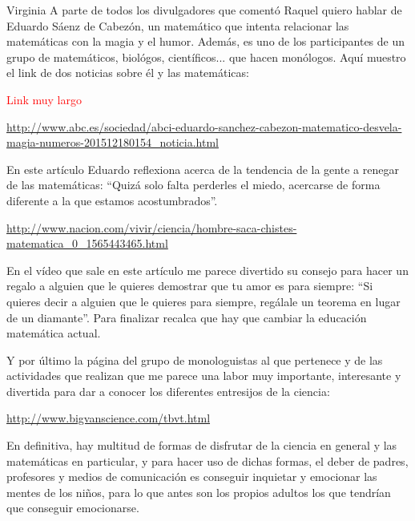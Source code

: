 \begin{opin}{\virgicolor}{Virginia}
A parte de todos los divulgadores que comentó Raquel quiero hablar de Eduardo Sáenz de Cabezón, un matemático que intenta relacionar las matemáticas con la magia y el humor. Además, es uno de los participantes de un grupo de matemáticos, biológos, científicos... que hacen monólogos. Aquí muestro el link de dos noticias sobre él y las matemáticas:



\textcolor{red}{Link muy largo}

\url{http://www.abc.es/sociedad/abci-eduardo-sanchez-cabezon-matematico-desvela-magia-numeros-201512180154_noticia.html}

En este artículo Eduardo reflexiona acerca de la tendencia de la gente a renegar de las matemáticas: “Quizá solo falta perderles el miedo, acercarse de forma diferente a la que estamos acostumbrados”.

\url{http://www.nacion.com/vivir/ciencia/hombre-saca-chistes-matematica_0_1565443465.html}

En el vídeo que sale en este artículo me parece divertido su consejo para hacer un regalo a alguien que le quieres demostrar que tu amor es para siempre: “Si quieres decir a alguien que le quieres para siempre, regálale un teorema en lugar de un diamante”. Para finalizar recalca que hay que cambiar la educación matemática actual.

Y por último la página del grupo de monologuistas al que pertenece y de las actividades que realizan que me parece una labor muy importante, interesante y divertida para dar a conocer los diferentes entresijos de la ciencia:

\url{http://www.bigvanscience.com/tbvt.html}

En definitiva, hay multitud de formas de disfrutar de la ciencia en general y las matemáticas en particular, y para hacer uso de dichas formas, el deber de padres, profesores y medios de comunicación es conseguir inquietar y emocionar las mentes de los niños, para lo que antes son los propios adultos los que tendrían que conseguir emocionarse.

\end{opin}

